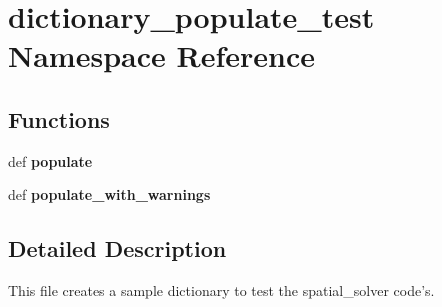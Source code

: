 \hypertarget{namespacedictionary__populate__test}{\section{dictionary\+\_\+populate\+\_\+test Namespace Reference}
\label{namespacedictionary__populate__test}
}
\subsection*{Functions}
\begin{DoxyCompactItemize}
\item 
\hypertarget{namespacedictionary__populate__test_a87be06a29ae062d50db1be2e806a54b7}{def {\bfseries populate}}\label{namespacedictionary__populate__test_a87be06a29ae062d50db1be2e806a54b7}

\item 
\hypertarget{namespacedictionary__populate__test_a88677c6b3cdec186c5e145dc2b3d05b2}{def {\bfseries populate\+\_\+with\+\_\+warnings}}\label{namespacedictionary__populate__test_a88677c6b3cdec186c5e145dc2b3d05b2}

\end{DoxyCompactItemize}


\subsection{Detailed Description}
\begin{DoxyVerb}This file creates a sample dictionary to test the spatial_solver code's.\end{DoxyVerb}
 